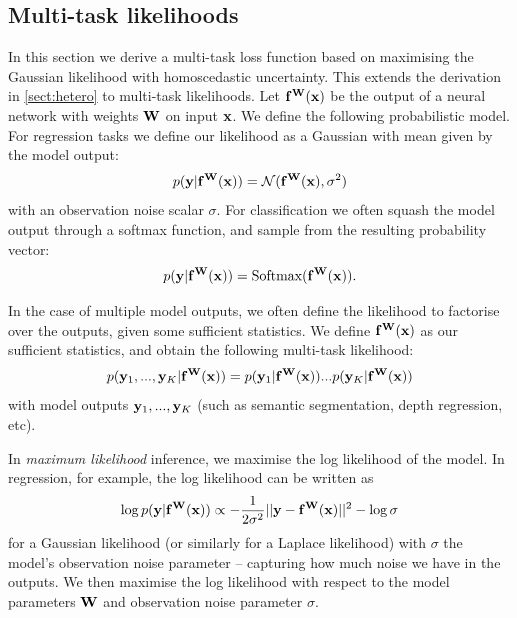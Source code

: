 \subsection{Multi-task likelihoods}
\label{sec:mt_loss}

In this section we derive a multi-task loss function based on maximising the Gaussian likelihood with homoscedastic uncertainty.
This extends the derivation in \cref{sect:hetero} to multi-task likelihoods.
Let $\mathbf{f}^{\mathbf{W}}(\mathbf{x})$ be the output of a neural network with weights $\mathbf{W}$ on input $\mathbf{x}$. We define the following probabilistic model. 
For regression tasks we define our likelihood as a Gaussian with mean given by the model output:
\begin{equation}
p(\mathbf{y} | \mathbf{f}^{\mathbf{W}}(\mathbf{x})) = \mathcal{N}(\mathbf{f}^{\mathbf{W}}(\mathbf{x}), \sigma^2)
\end{equation}
with an observation noise scalar $\sigma$. 
For classification we often squash the model output through a softmax function, and sample from the resulting probability vector:
\begin{equation}
p(\mathbf{y} | \mathbf{f}^{\mathbf{W}}(\mathbf{x})) = \text{Softmax}(\mathbf{f}^{\mathbf{W}}(\mathbf{x})).
\end{equation}

In the case of multiple model outputs, we often define the likelihood to factorise over the outputs, given some sufficient statistics. We define $\mathbf{f}^{\mathbf{W}}(\mathbf{x})$ as our sufficient statistics, and obtain the following multi-task likelihood:
\begin{equation}
p(\mathbf{y}_1, ..., \mathbf{y}_K | \mathbf{f}^{\mathbf{W}}(\mathbf{x})) = p(\mathbf{y}_1 | \mathbf{f}^{\mathbf{W}}(\mathbf{x})) ... p(\mathbf{y}_K | \mathbf{f}^{\mathbf{W}}(\mathbf{x}))
\end{equation}
with model outputs $\mathbf{y}_1, ..., \mathbf{y}_K$ (such as semantic segmentation, depth regression, etc).

In \textit{maximum likelihood} inference, we maximise the log likelihood of the model.
In regression, for example, the log likelihood can be written as
\begin{equation}
\log p(\mathbf{y} | \mathbf{f}^{\mathbf{W}}(\mathbf{x})) \propto 
-\frac{1}{2 \sigma^2}||\mathbf{y} - \mathbf{f}^{\mathbf{W}}(\mathbf{x})||^2 - \log \sigma
\end{equation}
for a Gaussian likelihood (or similarly for a Laplace likelihood)
with $\sigma$ the model's observation noise parameter -- capturing how much noise we have in the outputs. We then maximise the log likelihood with respect to the model parameters $\mathbf{W}$ and observation noise parameter $\sigma$.

